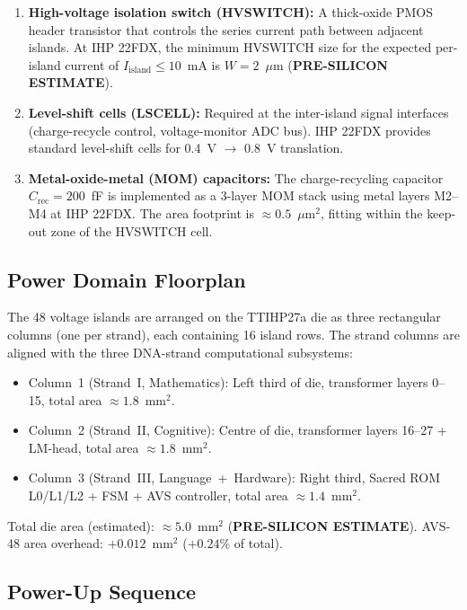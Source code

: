 \begin{enumerate}
  \item \textbf{High-voltage isolation switch (HVSWITCH):}
    A thick-oxide PMOS header transistor that controls the series current
    path between adjacent islands.  At IHP 22FDX, the minimum
    HVSWITCH size for the expected per-island current of
    $I_\mathrm{island} \leq 10$~mA is $W = 2$~$\mu$m
    (\textbf{PRE-SILICON ESTIMATE}).

  \item \textbf{Level-shift cells (LSCELL):}
    Required at the inter-island signal interfaces (charge-recycle
    control, voltage-monitor ADC bus).  IHP 22FDX provides standard
    level-shift cells for 0.4~V $\to$ 0.8~V translation.

  \item \textbf{Metal-oxide-metal (MOM) capacitors:}
    The charge-recycling capacitor $C_\mathrm{rec} = 200$~fF is
    implemented as a 3-layer MOM stack using metal layers M2--M4
    at IHP 22FDX.  The area footprint is $\approx 0.5$~$\mu$m$^2$,
    fitting within the keep-out zone of the HVSWITCH cell.
\end{enumerate}

\subsection{Power Domain Floorplan}

The 48 voltage islands are arranged on the TTIHP27a die as three
rectangular columns (one per strand), each containing 16 island rows.
The strand columns are aligned with the three DNA-strand computational
subsystems:

\begin{itemize}
  \item Column~1 (Strand~I, Mathematics): Left third of die,
    transformer layers 0--15, total area $\approx 1.8$~mm$^2$.
  \item Column~2 (Strand~II, Cognitive): Centre of die,
    transformer layers 16--27 + LM-head, total area $\approx 1.8$~mm$^2$.
  \item Column~3 (Strand~III, Language~+~Hardware): Right third,
    Sacred ROM L0/L1/L2 + FSM + AVS controller,
    total area $\approx 1.4$~mm$^2$.
\end{itemize}

Total die area (estimated): $\approx 5.0$~mm$^2$ (\textbf{PRE-SILICON ESTIMATE}).
AVS-48 area overhead: $+0.012$~mm$^2$ ($+0.24$\% of total).

\subsection{Power-Up Sequence}

